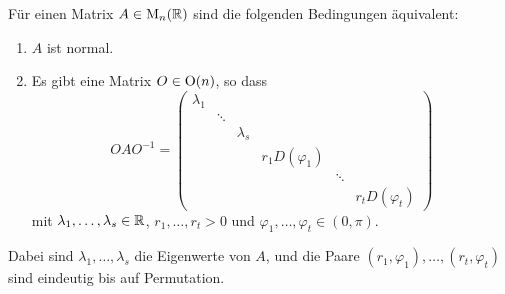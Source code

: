 \begin{corollary}\label{cor: normal form for real normal matrices}
  Für einen Matrix $A \in \mathrm{M}_n(\mathbb{R})$ sind die folgenden Bedingungen äquivalent:
  \begin{enumerate}[leftmargin=*, label=\roman*)]
    \item
      $A$ ist normal.
    \item
      Es gibt eine Matrix $O \in \mathrm{O}(n)$, so dass 
      \[
        O A O^{-1}
        =
        \begin{pmatrix}
          \lambda_1 &         &           &                   &         &                   \\
                    & \ddots  &           &                   &         &                   \\
                    &         & \lambda_s &                   &         &                   \\
                    &         &           & r_1 D(\varphi_1)  &         &                   \\
                    &         &           &                   & \ddots  &                   \\
                    &         &           &                   &         & r_t D(\varphi_t)
        \end{pmatrix}
      \]
      mit $\lambda_1, \dotsc, \lambda_s \in \mathbb{R}$, $r_1, \dotsc, r_t > 0$ und $\varphi_1, \dotsc, \varphi_t \in (0, \pi)$.
  \end{enumerate}
  Dabei sind $\lambda_1, \dotsc, \lambda_s$ die Eigenwerte von $A$, und die Paare $(r_1, \varphi_1), \dotsc, (r_t, \varphi_t)$ sind eindeutig bis auf Permutation.
\end{corollary}


